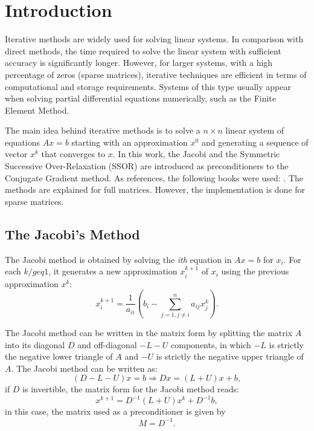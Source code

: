 \section{Introduction}\label{sec:introduction}
Iterative methods are widely used for solving linear systems. In comparison with direct methods, the time required to solve the linear system with sufficient accuracy is significantly longer. However, for larger systems, with a high percentage of zeros (sparse matrices), iterative techniques are efficient in terms of computational and storage requirements. Systems of this type usually appear when solving partial differential equations numerically, such as the Finite Element Method. 

The main idea behind iterative methods is to solve a $n \times n$ linear system of equations $Ax = b$ starting with an approximation $x^0$ and generating a sequence of vector $x^k$ that converges to $x$. In this work, the Jacobi and the Symmetric Successive Over-Relaxation (SSOR) are introduced as preconditioners to the Conjugate Gradient method.  As references, the following books were used: \cite{burden1997numerical,de2000metodos,golub2013matrix}. The methods are explained for full matrices. However, the implementation is done for sparse matrices.

\subsection{The Jacobi's Method}
The Jacobi method is obtained by solving the \textit{ith} equation in $Ax=b$ for $x_i$. For each $k/geq1$, it generates a new approximation $x^{k+1}_i$ of $x_i$ using the previous approximation $x^k$:
\begin{equation}
    x^{k+1}_i = \frac{1}{a_{ii}} \left( b_i - \sum_{j=1,j\neq i}^{n} a_{ij}x^k_j \right).
\end{equation} 

The Jacobi method can be written in the matrix form by splitting the matrix $A$ into its diagonal $D$ and off-diagonal $-L-U$ components, in which $-L$ is strictly the negative lower triangle of $A$ and $-U$ is strictly the negative upper triangle of $A$. The Jacobi method can be written as:
\begin{equation*}
    (D - L - U)x = b \Rightarrow Dx = (L + U)x + b,
\end{equation*} 
if $D$ is invertible, the matrix form for the Jacobi method reads:
\begin{equation}
    x^{k+1} = D^{-1}(L + U)x^k + D^{-1}b,
\end{equation}
in this case, the matrix used as a preconditioner is given by 
\begin{equation}
    \label{eq:Jacobi}
    M = D^{-1}.
\end{equation}

